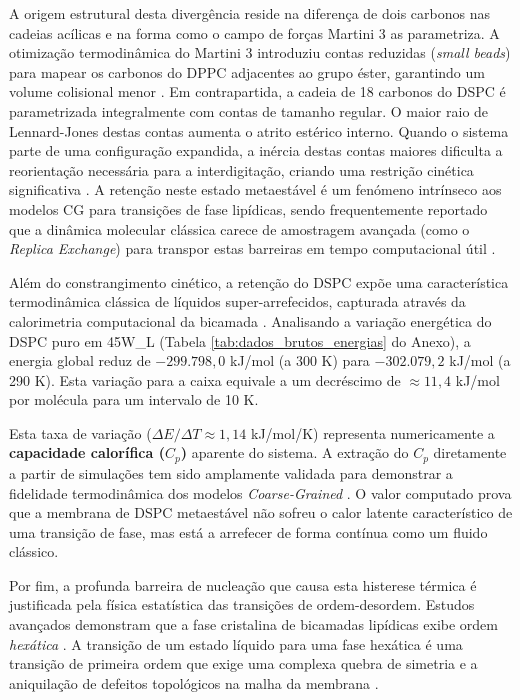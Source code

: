 A origem estrutural desta divergência reside na diferença de dois carbonos nas cadeias acílicas e na forma como o campo de forças Martini 3 as parametriza. A otimização termodinâmica do Martini 3 introduziu contas reduzidas (\textit{small beads}) para mapear os carbonos do DPPC adjacentes ao grupo éster, garantindo um volume colisional menor \cite{marrink2022, ramirez2025}. Em contrapartida, a cadeia de 18 carbonos do DSPC é parametrizada integralmente com contas de tamanho regular. O maior raio de Lennard-Jones destas contas aumenta o atrito estérico interno. Quando o sistema parte de uma configuração expandida, a inércia destas contas maiores dificulta a reorientação necessária para a interdigitação, criando uma restrição cinética significativa \cite{ramirez2025}. A retenção neste estado metaestável é um fenómeno intrínseco aos modelos CG para transições de fase lipídicas, sendo frequentemente reportado que a dinâmica molecular clássica carece de amostragem avançada (como o \textit{Replica Exchange}) para transpor estas barreiras em tempo computacional útil \cite{piskulich2022}.

Além do constrangimento cinético, a retenção do DSPC expõe uma característica termodinâmica clássica de líquidos super-arrefecidos, capturada através da calorimetria computacional da bicamada \cite{rodgers2012}. Analisando a variação energética do DSPC puro em 45W\_L (Tabela \ref{tab:dados_brutos_energias} do Anexo), a energia global reduz de $-299.798,0$ kJ/mol (a 300 K) para $-302.079,2$ kJ/mol (a 290 K). Esta variação para a caixa equivale a um decréscimo de $\approx 11,4$ kJ/mol por molécula para um intervalo de 10 K. 

Esta taxa de variação ($\Delta E / \Delta T \approx 1,14$ kJ/mol/K) representa numericamente a \textbf{capacidade calorífica ($C_p$)} aparente do sistema. A extração do $C_p$ diretamente a partir de simulações tem sido amplamente validada para demonstrar a fidelidade termodinâmica dos modelos \textit{Coarse-Grained} \cite{rodgers2012}. O valor computado prova que a membrana de DSPC metaestável não sofreu o calor latente característico de uma transição de fase, mas está a arrefecer de forma contínua como um fluido clássico.

Por fim, a profunda barreira de nucleação que causa esta histerese térmica é justificada pela física estatística das transições de ordem-desordem. Estudos avançados demonstram que a fase cristalina de bicamadas lipídicas exibe ordem \textit{hexática} \cite{katira2015}. A transição de um estado líquido para uma fase hexática é uma transição de primeira ordem que exige uma complexa quebra de simetria e a aniquilação de defeitos topológicos na malha da membrana \cite{katira2015}. 


